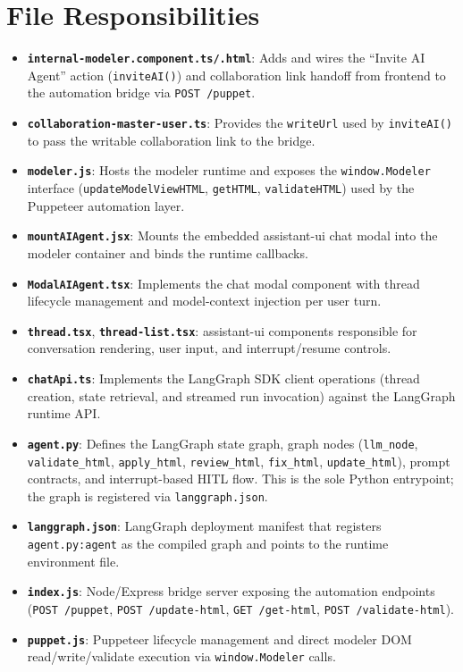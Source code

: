 \section{File Responsibilities}
\begin{itemize}
    \item \textbf{\texttt{internal-modeler.component.ts/.html}}: Adds and wires the ``Invite AI Agent'' action (\texttt{inviteAI()}) and collaboration link handoff from frontend to the automation bridge via \texttt{POST /puppet}.
    \item \textbf{\texttt{collaboration-master-user.ts}}: Provides the \texttt{writeUrl} used by \texttt{inviteAI()} to pass the writable collaboration link to the bridge.
    \item \textbf{\texttt{modeler.js}}: Hosts the modeler runtime and exposes the \texttt{window.Modeler} interface (\texttt{updateModelViewHTML}, \texttt{getHTML}, \texttt{validateHTML}) used by the Puppeteer automation layer.
    \item \textbf{\texttt{mountAIAgent.jsx}}: Mounts the embedded assistant-ui chat modal into the modeler container and binds the runtime callbacks.
    \item \textbf{\texttt{ModalAIAgent.tsx}}: Implements the chat modal component with thread lifecycle management and model-context injection per user turn.
    \item \textbf{\texttt{thread.tsx}}, \textbf{\texttt{thread-list.tsx}}: assistant-ui components responsible for conversation rendering, user input, and interrupt/resume controls.
    \item \textbf{\texttt{chatApi.ts}}: Implements the LangGraph SDK client operations (thread creation, state retrieval, and streamed run invocation) against the LangGraph runtime API.
    \item \textbf{\texttt{agent.py}}: Defines the LangGraph state graph, graph nodes (\texttt{llm\_node}, \texttt{validate\_html}, \texttt{apply\_html}, \texttt{review\_html}, \texttt{fix\_html}, \texttt{update\_html}), prompt contracts, and interrupt-based HITL flow. This is the sole Python entrypoint; the graph is registered via \texttt{langgraph.json}.
    \item \textbf{\texttt{langgraph.json}}: LangGraph deployment manifest that registers \texttt{agent.py:agent} as the compiled graph and points to the runtime environment file.
    \item \textbf{\texttt{index.js}}: Node/Express bridge server exposing the automation endpoints (\texttt{POST /puppet}, \texttt{POST /update-html}, \texttt{GET /get-html}, \texttt{POST /validate-html}).
    \item \textbf{\texttt{puppet.js}}: Puppeteer lifecycle management and direct modeler DOM read/write/validate execution via \texttt{window.Modeler} calls.
\end{itemize}

